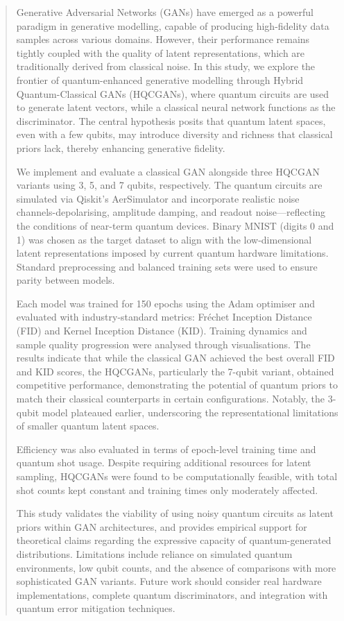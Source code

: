 \begin{abstract}

Generative Adversarial Networks (GANs) have emerged as a powerful paradigm in generative modelling, capable of producing high-fidelity data samples across various domains. However, their performance remains tightly coupled with the quality of latent representations, which are traditionally derived from classical noise. In this study, we explore the frontier of quantum-enhanced generative modelling through Hybrid Quantum-Classical GANs (HQCGANs), where quantum circuits are used to generate latent vectors, while a classical neural network functions as the discriminator. The central hypothesis posits that quantum latent spaces, even with a few qubits, may introduce diversity and richness that classical priors lack, thereby enhancing generative fidelity.

We implement and evaluate a classical GAN alongside three HQCGAN variants using 3, 5, and 7 qubits, respectively. The quantum circuits are simulated via Qiskit's AerSimulator and incorporate realistic noise channels-depolarising, amplitude damping, and readout noise—reflecting the conditions of near-term quantum devices. Binary MNIST (digits 0 and 1) was chosen as the target dataset to align with the low-dimensional latent representations imposed by current quantum hardware limitations. Standard preprocessing and balanced training sets were used to ensure parity between models.

Each model was trained for 150 epochs using the Adam optimiser and evaluated with industry-standard metrics: Fréchet Inception Distance (FID) and Kernel Inception Distance (KID). Training dynamics and sample quality progression were analysed through visualisations. The results indicate that while the classical GAN achieved the best overall FID and KID scores, the HQCGANs, particularly the 7-qubit variant, obtained competitive performance, demonstrating the potential of quantum priors to match their classical counterparts in certain configurations. Notably, the 3-qubit model plateaued earlier, underscoring the representational limitations of smaller quantum latent spaces.

Efficiency was also evaluated in terms of epoch-level training time and quantum shot usage. Despite requiring additional resources for latent sampling, HQCGANs were found to be computationally feasible, with total shot counts kept constant and training times only moderately affected.

This study validates the viability of using noisy quantum circuits as latent priors within GAN architectures, and provides empirical support for theoretical claims regarding the expressive capacity of quantum-generated distributions. Limitations include reliance on simulated quantum environments, low qubit counts, and the absence of comparisons with more sophisticated GAN variants. Future work should consider real hardware implementations, complete quantum discriminators, and integration with quantum error mitigation techniques.


\end{abstract}
